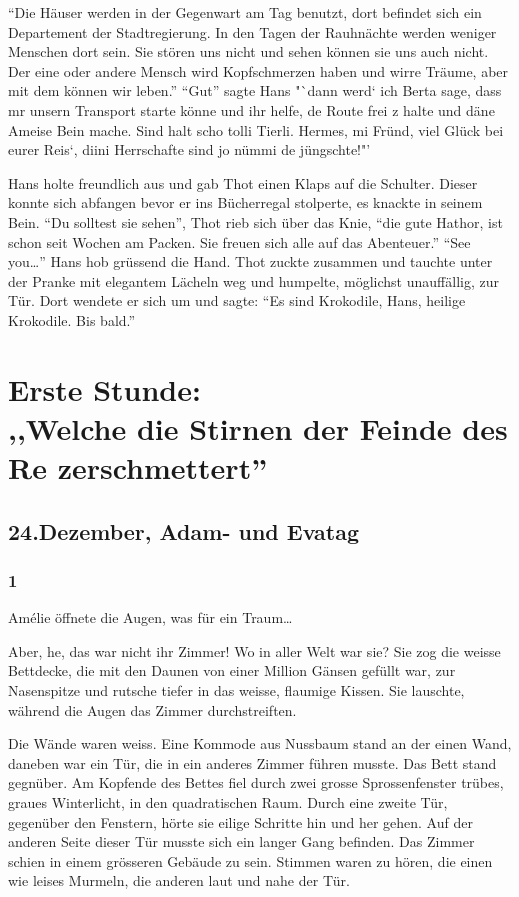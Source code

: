 \documentclass[11pt,titlepage,a5paper]{book}
\begin{document}
"`Die Häuser werden in der Gegenwart am Tag benutzt, dort befindet sich ein Departement der Stadtregierung. In den Tagen der Rauhnächte werden weniger Menschen dort sein. Sie stören uns nicht und sehen können sie uns auch nicht. Der eine oder andere Mensch wird Kopfschmerzen haben und wirre Träume, aber mit dem können wir leben."' "`Gut"' sagte Hans  "`dann werd` ich Berta sage, dass mr unsern Transport starte könne und ihr helfe, de Route frei z halte und däne Ameise Bein mache. Sind halt scho tolli Tierli. Hermes, mi Fründ, viel Glück bei eurer Reis`, diini Herrschafte sind jo nümmi de jüngschte!"'

Hans holte freundlich aus und gab Thot einen Klaps auf die Schulter. Dieser konnte sich abfangen bevor er ins Bücherregal stolperte, es knackte in seinem Bein. "`Du solltest sie sehen"', Thot rieb sich über das Knie, "`die gute Hathor, ist schon seit Wochen am Packen. Sie freuen sich alle auf das Abenteuer."' "`See you\dots"' Hans hob grüssend die Hand. Thot zuckte zusammen und tauchte unter der Pranke mit elegantem Lächeln weg und humpelte, möglichst unauffällig, zur Tür. Dort wendete er sich um und sagte: "`Es sind Krokodile, Hans, heilige Krokodile. Bis bald."'


\part*{Erste Stunde:\\,,Welche die Stirnen der Feinde des Re zerschmettert''}


\chapter*{24.Dezember, Adam- und Evatag}

\section*{1}

Amélie öffnete die Augen, was für ein Traum\dots

Aber, he, das war nicht ihr Zimmer! Wo in aller Welt war sie? Sie zog die weisse Bettdecke, die mit den Daunen von einer Million Gänsen gefüllt war, zur Nasenspitze und rutsche tiefer in das weisse, flaumige Kissen. Sie lauschte, während die Augen das Zimmer durchstreiften. 

Die Wände waren weiss. Eine Kommode aus Nussbaum stand an der einen Wand, daneben war ein Tür, die in ein anderes Zimmer führen musste. Das Bett stand gegnüber. Am Kopfende des Bettes fiel durch zwei grosse Sprossenfenster trübes, graues Winterlicht, in den quadratischen Raum. Durch eine zweite Tür, gegenüber den Fenstern, hörte sie eilige Schritte hin und her gehen. Auf der anderen Seite dieser Tür musste sich ein langer Gang befinden. Das Zimmer schien in einem grösseren Gebäude zu sein. Stimmen waren zu hören, die einen wie leises Murmeln, die anderen laut und nahe der Tür.
\end{document}

